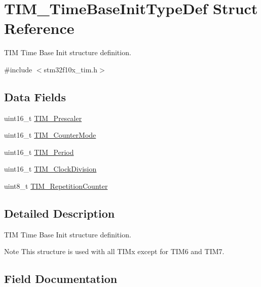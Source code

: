 \hypertarget{struct_t_i_m___time_base_init_type_def}{}\section{T\+I\+M\+\_\+\+Time\+Base\+Init\+Type\+Def Struct Reference}
\label{struct_t_i_m___time_base_init_type_def}


T\+IM Time Base Init structure definition.  




{\ttfamily \#include $<$stm32f10x\+\_\+tim.\+h$>$}

\subsection*{Data Fields}
\begin{DoxyCompactItemize}
\item 
uint16\+\_\+t \mbox{\hyperlink{struct_t_i_m___time_base_init_type_def_a30c6857997a4ddd7d3d66fd3a8907c37}{T\+I\+M\+\_\+\+Prescaler}}
\item 
uint16\+\_\+t \mbox{\hyperlink{struct_t_i_m___time_base_init_type_def_adfc97c66bfce30e74ce779ab04c156e9}{T\+I\+M\+\_\+\+Counter\+Mode}}
\item 
uint16\+\_\+t \mbox{\hyperlink{struct_t_i_m___time_base_init_type_def_a169131a7437571cef140fd53a82cd0fc}{T\+I\+M\+\_\+\+Period}}
\item 
uint16\+\_\+t \mbox{\hyperlink{struct_t_i_m___time_base_init_type_def_a2142bf86a7116c8c98ab015d5606fc98}{T\+I\+M\+\_\+\+Clock\+Division}}
\item 
uint8\+\_\+t \mbox{\hyperlink{struct_t_i_m___time_base_init_type_def_a121b27ced71ccb2c85f1d9825ae8d496}{T\+I\+M\+\_\+\+Repetition\+Counter}}
\end{DoxyCompactItemize}


\subsection{Detailed Description}
T\+IM Time Base Init structure definition. 

\begin{DoxyNote}{Note}
This structure is used with all T\+I\+Mx except for T\+I\+M6 and T\+I\+M7. 
\end{DoxyNote}


\subsection{Field Documentation}
\mbox{\label{struct_t_i_m___time_base_init_type_def_a2142bf86a7116c8c98ab015d5606fc98}} 
